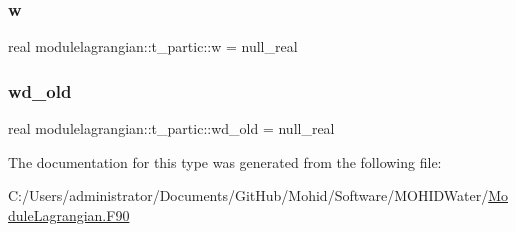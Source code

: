 \subsubsection{\texorpdfstring{w}{w}}
{\footnotesize\ttfamily real modulelagrangian\+::t\+\_\+partic\+::w = null\+\_\+real\hspace{0.3cm}{\ttfamily [private]}}

\mbox{\label{structmodulelagrangian_1_1t__partic_a03e8d2c88e95d98f1a7815de9ec1a354}} 
\subsubsection{\texorpdfstring{wd\+\_\+old}{wd\_old}}
{\footnotesize\ttfamily real modulelagrangian\+::t\+\_\+partic\+::wd\+\_\+old = null\+\_\+real\hspace{0.3cm}{\ttfamily [private]}}



The documentation for this type was generated from the following file\+:\begin{DoxyCompactItemize}
\item 
C\+:/\+Users/administrator/\+Documents/\+Git\+Hub/\+Mohid/\+Software/\+M\+O\+H\+I\+D\+Water/\mbox{\hyperlink{_module_lagrangian_8_f90}{Module\+Lagrangian.\+F90}}\end{DoxyCompactItemize}
